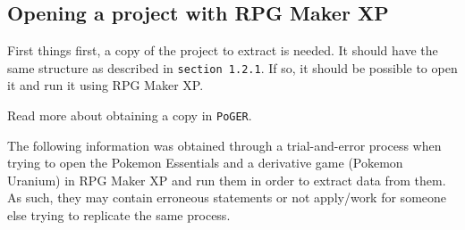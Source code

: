 \documentclass[11pt]{article}
\begin{document}
\subsection{Opening a project with RPG Maker XP}

First things first, a copy of the project to extract is needed. It should have the same structure as described in \verb|section 1.2.1|. If so, it should be possible to open it and run it using RPG Maker XP.

Read more about obtaining a copy in \verb|PoGER|.

The following information was obtained through a trial-and-error process when trying to open the Pokemon Essentials and a derivative game (Pokemon Uranium) in RPG Maker XP and run them in order to extract data from them. As such, they may contain erroneous statements or not apply/work for someone else trying to replicate the same process.
\end{document}
